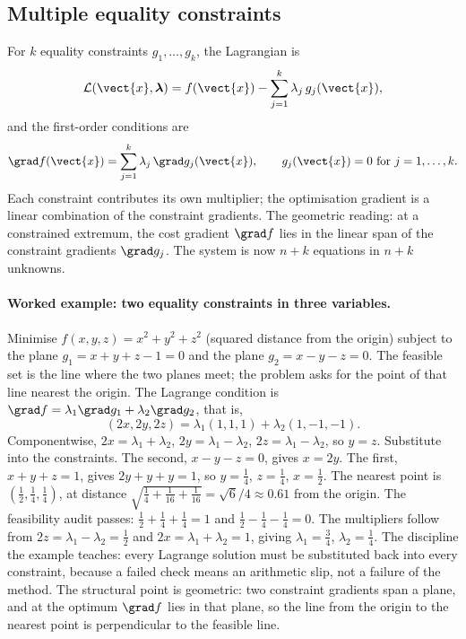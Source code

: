 

\subsection{Multiple equality constraints}

For $k$ equality constraints $g_{1}, \ldots, g_{k}$, the Lagrangian
is
\[
\mathcal{L}(\vect{x}, \boldsymbol{\lambda}) = f(\vect{x}) -
\sum_{j = 1}^{k} \lambda_{j}\,g_{j}(\vect{x}),
\]
and the first-order conditions are
\[
\grad f(\vect{x}) = \sum_{j = 1}^{k} \lambda_{j}\,\grad g_{j}(
\vect{x}), \qquad g_{j}(\vect{x}) = 0 \text{ for } j = 1, \ldots, k.
\]
Each constraint contributes its own multiplier; the optimisation
gradient is a linear combination of the constraint gradients. The
geometric reading: at a constrained extremum, the cost gradient
$\grad f$ lies in the linear span of the constraint gradients
$\grad g_{j}$. The system is now $n + k$ equations in $n + k$
unknowns.

\paragraph{Worked example: two equality constraints in three
variables.} Minimise $f(x, y, z) = x^{2} + y^{2} + z^{2}$ (squared
distance from the origin) subject to the plane $g_{1} = x + y + z -
1 = 0$ and the plane $g_{2} = x - y - z = 0$. The feasible set is
the line where the two planes meet; the problem asks for the point
of that line nearest the origin. The Lagrange condition is $\grad f
= \lambda_{1}\grad g_{1} + \lambda_{2}\grad g_{2}$, that is,
\[
(2x, 2y, 2z) = \lambda_{1}(1, 1, 1) + \lambda_{2}(1, -1, -1).
\]
Componentwise, $2x = \lambda_{1} + \lambda_{2}$, $2y = \lambda_{1} -
\lambda_{2}$, $2z = \lambda_{1} - \lambda_{2}$, so $y = z$.
Substitute into the constraints. The second, $x - y - z = 0$, gives
$x = 2y$. The first, $x + y + z = 1$, gives $2y + y + y = 1$, so
$y = \tfrac{1}{4}$, $z = \tfrac{1}{4}$, $x = \tfrac{1}{2}$. The
nearest point is $(\tfrac{1}{2}, \tfrac{1}{4}, \tfrac{1}{4})$, at
distance $\sqrt{\tfrac{1}{4} + \tfrac{1}{16} + \tfrac{1}{16}} =
\sqrt{6}/4 \approx 0.61$ from the origin. The feasibility audit
passes: $\tfrac{1}{2} + \tfrac{1}{4} + \tfrac{1}{4} = 1$ and
$\tfrac{1}{2} - \tfrac{1}{4} - \tfrac{1}{4} = 0$. The multipliers
follow from $2z = \lambda_{1} - \lambda_{2} = \tfrac{1}{2}$ and
$2x = \lambda_{1} + \lambda_{2} = 1$, giving $\lambda_{1} =
\tfrac{3}{4}$, $\lambda_{2} = \tfrac{1}{4}$. The discipline the
example teaches: every Lagrange solution must be substituted back
into every constraint, because a failed check means an arithmetic
slip, not a failure of the method. The structural point is geometric:
two constraint gradients span a plane, and at the optimum $\grad f$
lies in that plane, so the line from the origin to the nearest point
is perpendicular to the feasible line.

